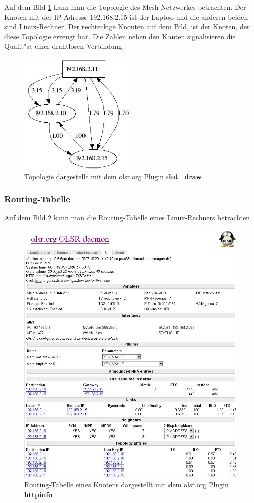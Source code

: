 Auf dem Bild \ref{fig:Topology} kann man die Topologie des Mesh-Netzwerkes
betrachten. Der Knoten mit der IP-Adresse 192.168.2.15 ist der Laptop und
die anderen beiden sind Linux-Rechner. Der rechteckige Knonten auf dem Bild, ist
der Knoten, der diese Topologie erzeugt hat. Die Zahlen neben den Kanten
signalisieren die Qualit"at einer drahtlosen Verbindung.

\begin{figure}[H]
\centering
\includegraphics[width=0.5\textwidth]{images/Topology.jpg}
\caption{Topologie dargestellt mit dem olsr.org Plugin \textbf{dot\_draw}}
\label{fig:Topology}
\end{figure}

\clearpage
\subsubsection{Routing-Tabelle}

Auf dem Bild \ref{fig:httpinfo} kann man die Routing-Tabelle
eines Linux-Rechners betrachten

\begin{figure}[H]
\centering
\includegraphics[width=1.0\textwidth]{images/Olsr_Route.jpg}
\caption{Routing-Tabelle eines Knotens dargestellt
	mit dem olsr.org Plugin \textbf{httpinfo}}
\label{fig:httpinfo}
\end{figure}
